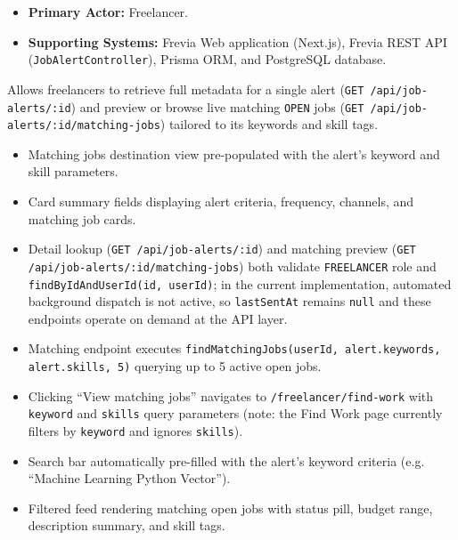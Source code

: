 
\begin{itemize}[leftmargin=1.6em,topsep=3pt,itemsep=2pt,parsep=0pt,label=$\bullet$]
    \item \textbf{Primary Actor:} Freelancer.
    \item \textbf{Supporting Systems:} Frevia Web application (Next.js), Frevia REST API (\texttt{JobAlertController}), Prisma ORM, and PostgreSQL database.
\end{itemize}

\noindent Allows freelancers to retrieve full metadata for a single alert (\texttt{GET /api/job-alerts/:id}) and preview or browse live matching \texttt{OPEN} jobs (\texttt{GET /api/job-alerts/:id/matching-jobs}) tailored to its keywords and skill tags.

\begin{itemize}[leftmargin=1.6em,topsep=3pt,itemsep=2pt,parsep=0pt,label=$\bullet$]
    \item Matching jobs destination view pre-populated with the alert's keyword and skill parameters.
    \item Card summary fields displaying alert criteria, frequency, channels, and matching job cards.
\end{itemize}

\begin{itemize}[leftmargin=1.6em,topsep=3pt,itemsep=2pt,parsep=0pt,label=$\bullet$]
    \item Detail lookup (\texttt{GET /api/job-alerts/:id}) and matching preview (\texttt{GET /api/job-alerts/:id/matching-jobs}) both validate \texttt{FREELANCER} role and \texttt{findByIdAndUserId(id, userId)}; in the current implementation, automated background dispatch is not active, so \texttt{lastSentAt} remains \texttt{null} and these endpoints operate on demand at the API layer.
    \item Matching endpoint executes \texttt{findMatchingJobs(userId, alert.keywords, alert.skills, 5)} querying up to 5 active open jobs.
    \item Clicking ``View matching jobs'' navigates to \texttt{/freelancer/find-work} with \texttt{keyword} and \texttt{skills} query parameters (note: the Find Work page currently filters by \texttt{keyword} and ignores \texttt{skills}).
\end{itemize}

\begin{itemize}[leftmargin=1.6em,topsep=3pt,itemsep=2pt,parsep=0pt,label=$\bullet$]
    \item Search bar automatically pre-filled with the alert's keyword criteria (e.g. ``Machine Learning Python Vector'').
    \item Filtered feed rendering matching open jobs with status pill, budget range, description summary, and skill tags.
\end{itemize}

